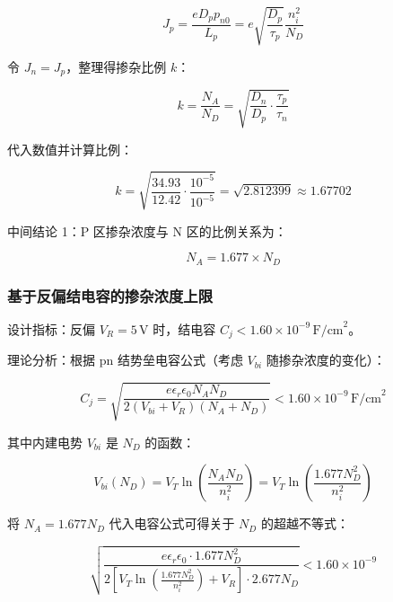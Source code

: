 \documentclass[12pt,a4paper]{article}
\begin{document}
\begin{equation}
J_p = \frac{e D_p p_{n0}}{L_p} = e \sqrt{\frac{D_p}{\tau_p}} \frac{n_i^2}{N_D}
\end{equation}

令 $J_n = J_p$，整理得掺杂比例 $k$：

\begin{equation}
k = \frac{N_A}{N_D} = \sqrt{\frac{D_n}{D_p} \cdot \frac{\tau_p}{\tau_n}}
\end{equation}

代入数值并计算比例：

\begin{equation}
k = \sqrt{\frac{34.93}{12.42} \cdot \frac{10^{-5}}{10^{-5}}} = \sqrt{2.812399} \approx 1.67702
\end{equation}

{\heiti 中间结论 1：}P 区掺杂浓度与 N 区的比例关系为：

\begin{equation}
\boxed{N_A = 1.677 \times N_D}
\end{equation}

\subsubsection{基于反偏结电容的掺杂浓度上限}

{\heiti 设计指标：}反偏 $V_R = 5\,\text{V}$ 时，结电容 $C_j < 1.60 \times 10^{-9}\,\text{F/cm}^2$。

{\heiti 理论分析：}根据 pn 结势垒电容公式（考虑 $V_{bi}$ 随掺杂浓度的变化）：

\begin{equation}
C_j = \sqrt{\frac{e \epsilon_r \epsilon_0 N_A N_D}{2(V_{bi} + V_R)(N_A + N_D)}} < 1.60 \times 10^{-9}\,\text{F/cm}^2
\end{equation}

其中内建电势 $V_{bi}$ 是 $N_D$ 的函数：

\begin{equation}
V_{bi}(N_D) = V_T \ln \left( \frac{N_A N_D}{n_i^2} \right) = V_T \ln \left( \frac{1.677 N_D^2}{n_i^2} \right)
\end{equation}

将 $N_A = 1.677 N_D$ 代入电容公式可得关于 $N_D$ 的超越不等式：

\begin{equation}
\sqrt{\frac{e \epsilon_r \epsilon_0 \cdot 1.677 N_D^2}{2 \left[ V_T \ln \left( \frac{1.677 N_D^2}{n_i^2} \right) + V_R \right] \cdot 2.677 N_D}} < 1.60 \times 10^{-9}
\end{equation}
\end{document}
